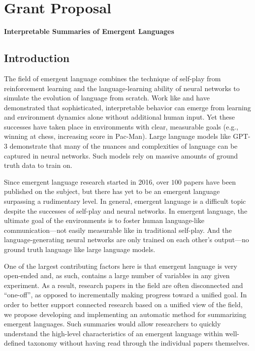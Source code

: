 \chapter{Grant Proposal}

{\Large\bf Interpretable Summaries of Emergent Languages}

\section{Introduction}

The field of emergent language combines the technique of self-play from reinforcement learning and the language-learning ability of neural networks to simulate the evolution of language from scratch.
Work like  and  have demonstrated that sophisticated, interpretable behavior can emerge from learning and environment dynamics alone without additional human input.
Yet these successes have taken place in environments with clear, measurable goals (e.g., winning at chess, increasing score in Pac-Man).
Large language models like GPT-3  demonstrate that many of the nuances and complexities of language can be captured in neural networks.
Such models rely on massive amounts of ground truth data to train on.

Since emergent language research started in 2016, over $100$ papers have been published on the subject, but there has yet to be an emergent language surpassing a rudimentary level.
In general, emergent language is a difficult topic despite the successes of self-play and neural networks.
In emergent language, the ultimate goal of the environments is to foster human language-like communication---not easily measurable like in traditional self-play.
And the language-generating neural networks are only trained on each other's output---no ground truth language like large language models.

One of the largest contributing factors here is that emergent language is very open-ended and, as such, contains a large number of variables in any given experiment.
As a result, research papers in the field are often disconnected and ``one-off'', as opposed to incrementally making progress toward a unified goal.
In order to better support connected research based on a unified view of the field, we propose developing and implementing an automatic method for summarizing emergent languages.
Such summaries would allow researchers to quickly understand the high-level characteristics of an emergent language within well-defined taxonomy without having read through the individual papers themselves.

